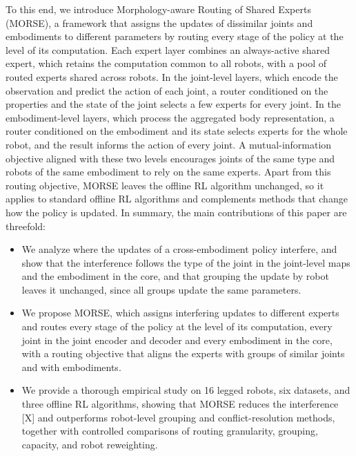 To this end, we introduce Morphology-aware Routing of Shared Experts (MORSE), a framework that assigns the updates of
dissimilar joints and embodiments to different parameters by routing every stage of the policy at the level of its
computation. Each expert layer combines an always-active shared expert, which retains the computation common to all
robots, with a pool of routed experts shared across robots. In the joint-level layers, which encode the observation
and predict the action of each joint, a router conditioned on the properties and the state of the joint selects a few
experts for every joint. In the embodiment-level layers, which process the aggregated body representation, a router
conditioned on the embodiment and its state selects experts for the whole robot, and the result informs the action of
every joint. A mutual-information objective aligned with these two levels encourages joints of the same type and
robots of the same embodiment to rely on the same experts. Apart from this routing objective, MORSE leaves the offline
RL algorithm unchanged, so it applies to standard offline RL algorithms and complements methods that change how the
policy is updated. In summary, the main contributions of this paper are threefold:
\begin{itemize}
    \item We analyze where the updates of a cross-embodiment policy interfere, and show that the interference follows
    the type of the joint in the joint-level maps and the embodiment in the core, and that grouping the update by robot
    leaves it unchanged, since all groups update the same parameters.
    \item We propose MORSE, which assigns interfering updates to different experts and routes every stage of the policy
    at the level of its computation, every joint in the joint encoder and decoder and every embodiment in the core,
    with a routing objective that aligns the experts with groups of similar joints and with embodiments.
    \item We provide a thorough empirical study on 16 legged robots, six datasets, and three offline RL algorithms,
    showing that MORSE reduces the interference [X] and outperforms robot-level grouping and conflict-resolution
    methods, together with controlled comparisons of routing granularity, grouping, capacity, and robot reweighting.
\end{itemize}


